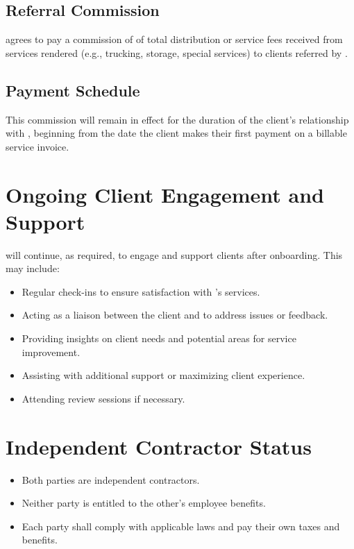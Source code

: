 \documentclass[12pt]{article}
\begin{document}
\subsection{Referral Commission}
\partyBshort{} agrees to pay \partyAshort{} a commission of \commissionRate{} of total distribution or service fees received from services rendered (e.g., trucking, storage, special services) to clients referred by \partyAshort{}.

\subsection{Payment Schedule}
This commission will remain in effect for the duration of the client’s relationship with \textbf{\partyBshort}, beginning from the date the client makes their first payment on a billable service invoice.

\section{Ongoing Client Engagement and Support}
\partyAshort{} will continue, as required, to engage and support clients after onboarding. This may include:
\begin{itemize}
  \item Regular check-ins to ensure satisfaction with \partyBshort{}’s services.
  \item Acting as a liaison between the client and \partyBshort{} to address issues or feedback.
  \item Providing insights on client needs and potential areas for service improvement.
  \item Assisting with additional support or maximizing client experience.
  \item Attending review sessions if necessary.
\end{itemize}

\section{Independent Contractor Status}
\begin{itemize}
  \item Both parties are independent contractors.
  \item Neither party is entitled to the other’s employee benefits.
  \item Each party shall comply with applicable laws and pay their own taxes and benefits.
\end{itemize}
\end{document}
